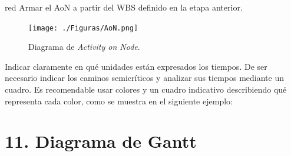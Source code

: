 \documentclass[
11pt, %
]{charter}
\begin{document}
\begin{consigna}{red}
Armar el AoN a partir del WBS definido en la etapa anterior. 



\end{consigna}

\begin{figure}[htpb]
\centering 
\texttt{[image: ./Figuras/AoN.png]}
\caption{Diagrama de \textit{Activity on Node}.}
\label{fig:AoN}
\end{figure}

Indicar claramente en qué unidades están expresados los tiempos.
De ser necesario indicar los caminos semicríticos y analizar sus tiempos mediante un cuadro.
Es recomendable usar colores y un cuadro indicativo describiendo qué representa cada color, como se muestra en el siguiente ejemplo:



\section{11. Diagrama de Gantt}
\label{sec:gantt}
\end{document}
